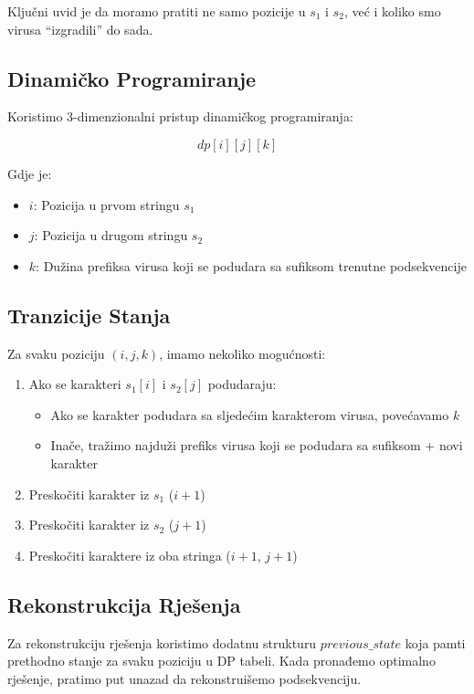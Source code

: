Ključni uvid je da moramo pratiti ne samo pozicije u $s_1$ i $s_2$, već i koliko smo virusa ``izgradili'' do sada.

\subsection{Dinamičko Programiranje}
Koristimo 3-dimenzionalni pristup dinamičkog programiranja:

\begin{equation*}
dp[i][j][k]
\end{equation*}

Gdje je:
\begin{itemize}
    \item $i$: Pozicija u prvom stringu $s_1$
    \item $j$: Pozicija u drugom stringu $s_2$
    \item $k$: Dužina prefiksa virusa koji se podudara sa sufiksom trenutne podsekvencije
\end{itemize}

\subsection{Tranzicije Stanja}
Za svaku poziciju $(i,j,k)$, imamo nekoliko mogućnosti:
\begin{enumerate}
    \item Ako se karakteri $s_1[i]$ i $s_2[j]$ podudaraju:
    \begin{itemize}
        \item Ako se karakter podudara sa sljedećim karakterom virusa, povećavamo $k$
        \item Inače, tražimo najduži prefiks virusa koji se podudara sa sufiksom + novi karakter
    \end{itemize}
    \item Preskočiti karakter iz $s_1$ ($i+1$)
    \item Preskočiti karakter iz $s_2$ ($j+1$)
    \item Preskočiti karaktere iz oba stringa ($i+1$, $j+1$)
\end{enumerate}

\subsection{Rekonstrukcija Rješenja}
Za rekonstrukciju rješenja koristimo dodatnu strukturu $previous\_state$ koja pamti prethodno stanje za svaku poziciju u DP tabeli. Kada pronađemo optimalno rješenje, pratimo put unazad da rekonstruišemo podsekvenciju.


